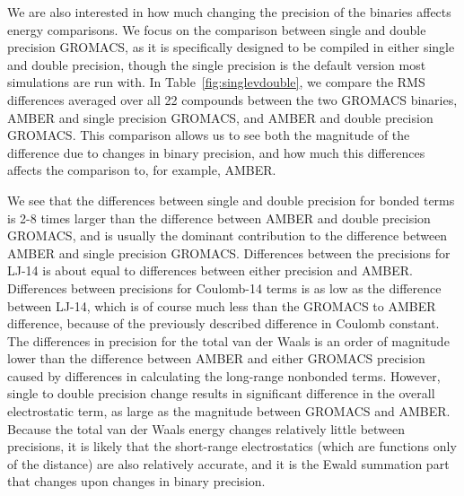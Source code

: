We are also interested in how much changing the precision of the
binaries affects energy comparisons.  We focus on the comparison
between single and double precision GROMACS, as it is specifically
designed to be compiled in either single and double precision, though
the single precision is the default version most simulations are run
with. In Table~\ref{fig:singlevdouble}, we compare the RMS differences
averaged over all 22 compounds between the two GROMACS binaries, AMBER
and single precision GROMACS, and AMBER and double precision GROMACS.
This comparison allows us to see both the magnitude of the difference
due to changes in binary precision, and how much this differences
affects the comparison to, for example, AMBER.

We see that the differences between single and double precision for
bonded terms is 2-8 times larger than the difference between AMBER and
double precision GROMACS, and is usually the dominant contribution to
the difference between AMBER and single precision GROMACS.
Differences between the precisions for LJ-14 is about equal to
differences between either precision and AMBER.  Differences between
precisions for Coulomb-14 terms is as low as the difference between
LJ-14, which is of course much less than the GROMACS to AMBER
difference, because of the previously described difference in Coulomb
constant. The differences in precision for the total van der Waals is
an order of magnitude lower than the difference between AMBER and
either GROMACS precision caused by differences in calculating the
long-range nonbonded terms.  However, single to double precision
change results in significant difference in the overall electrostatic
term, as large as the magnitude between GROMACS and AMBER.  Because
the total van der Waals energy changes relatively little between
precisions, it is likely that the short-range electrostatics (which
are functions only of the distance) are also relatively accurate, and
it is the Ewald summation part that changes upon changes in binary precision.


